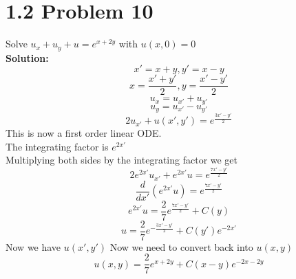 \documentclass{article}
\begin{document}
\section*{1.2 Problem 10}
Solve $u_x + u_y + u = e^{x+2y}$ with $u(x,0) = 0$ \\
\textbf{Solution:}\\
$$x' = x+y, y' = x - y$$
$$x = \frac{x' + y'}{2}, y = \frac{x' - y'}{2}$$
$$u_x = u_{x'} + u_{y'}$$
$$u_y = u_{x'} - u_{y'}$$
$$2u_{x'} + u(x',y') = e^{\frac{3x' -y'}{2}}$$
This is now a first order linear ODE.\\
The integrating factor is $e^{2x'}$\\
Multiplying both sides by the integrating factor we get
$$2e^{2x'}u_{x'} + e^{2x'}u = e^{\frac{7x' -y'}{2}}$$
$$\frac{d}{dx'}(e^{2x'}u) = e^{\frac{7x' -y'}{2}}$$
$$e^{2x'}u = \frac{2}{7}e^{\frac{7x' -y'}{2}} + C(y)$$
$$u = \frac{2}{7}e^{-\frac{3x' -y'}{2}} + C(y')e^{-2x'}$$
Now we have $u(x', y')$ Now we need to convert back into $u(x,y)$\\
$$u(x, y) = \frac{2}{7}e^{x+2y} + C(x-y)e^{-2x-2y}$$
\end{document}
